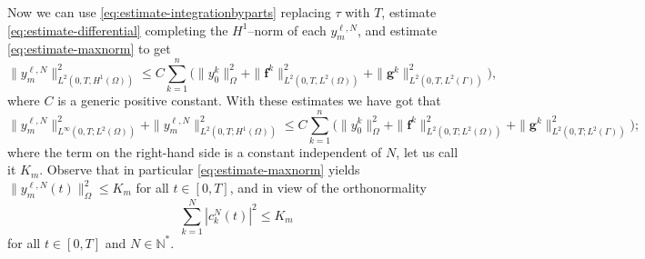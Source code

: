 \documentclass[11pt]{article}
\newcommand{\N}{\mathbb{N}}
\numberwithin{equation}{section}
\begin{document}
	Now we can use \eqref{eq:estimate-integrationbyparts} replacing \(\tau\) with \(T\), estimate \eqref{eq:estimate-differential} completing the \(H^1\)--norm of each \(y_m^{\ell,N}\), and estimate \eqref{eq:estimate-maxnorm} to get
	\[
		\| y_m^{\ell,N} \|^2_{L^2(0,T, H^1(\Omega))}
		\leq 
		C \sum_{k=1}^n \bigg(  \|  y_0^k \|^2_\Omega + \|\mathbf{f}^k\|^2_{L^2(0,T, L^2(\Omega))} + \|\mathbf{g}^k\|^2_{L^2(0,T, L^2(\Gamma))} \bigg),
	\]
	where \(C\) is a generic positive constant. With these estimates we have got that
	\[
		\|  y_m^{\ell,N} \|^2_{L^\infty (0,T;L^2(\Omega) )} 
		+ \| y_m^{\ell,N} \|^2_{L^2(0,T;H^1(\Omega))}
		\leq 
		C \sum_{k=1}^n \bigg(  \|  y_0^k \|^2_\Omega + \|\mathbf{f}^k\|^2_{L^2(0,T;L^2(\Omega))} + \|\mathbf{g}^k\|^2_{L^2(0,T;L^2(\Gamma))} \bigg);
	\]
	where the term on the right-hand side is a constant independent of \(N\), let us call it \(K_{m}\). 
	Observe that in particular \eqref{eq:estimate-maxnorm} yields \( \| y_m^{\ell,N}(t)\|_{\Omega}^2 \leq K_{m} \)  for all \(t\in [0,T]\), and in view of the orthonormality
	\begin{equation}
	\label{eq:boundness-of-coeffs}
		\sum_{k=1}^N |c_k^N(t)|^2 \leq K_{m}
	\end{equation}
	for all \(t\in [0,T]\) and \( N \in \N^*\).
	
\end{document}
